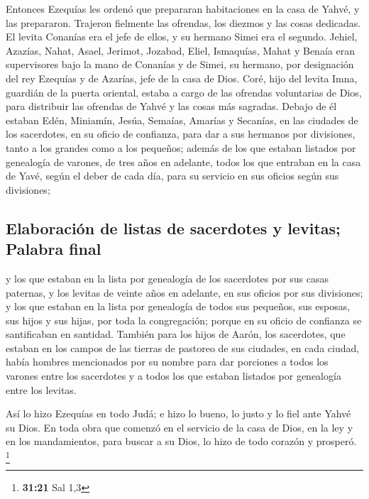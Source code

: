 \begin{paracol}{2}
 Entonces Ezequías les ordenó que prepararan habitaciones
en la casa de Yahvé, y las prepararon.  Trajeron
fielmente las ofrendas, los diezmos y las cosas dedicadas. El levita
Conanías era el jefe de ellos, y su hermano Simei era el segundo.
 Jehiel, Azazías, Nahat, Asael, Jerimot, Jozabad, Eliel,
Ismaquías, Mahat y Benaía eran supervisores bajo la mano de Conanías y
de Simei, su hermano, por designación del rey Ezequías y de Azarías,
jefe de la casa de Dios.  Coré, hijo del levita Imna,
guardián de la puerta oriental, estaba a cargo de las ofrendas
voluntarias de Dios, para distribuir las ofrendas de Yahvé y las cosas
más sagradas.  Debajo de él estaban Edén, Miniamín,
Jesúa, Semaías, Amarías y Secanías, en las ciudades de los sacerdotes,
en su oficio de confianza, para dar a sus hermanos por divisiones, tanto
a los grandes como a los pequeños;  además de los que
estaban listados por genealogía de varones, de tres años en adelante,
todos los que entraban en la casa de Yavé, según el deber de cada día,
para su servicio en sus oficios según sus divisiones;

\hypertarget{elaboraciuxf3n-de-listas-de-sacerdotes-y-levitas-palabra-final}{%
\subsection{Elaboración de listas de sacerdotes y levitas; Palabra
final}\label{elaboraciuxf3n-de-listas-de-sacerdotes-y-levitas-palabra-final}}

 y los que estaban en la lista por genealogía de los
sacerdotes por sus casas paternas, y los levitas de veinte años en
adelante, en sus oficios por sus divisiones;  y los que
estaban en la lista por genealogía de todos sus pequeños, sus esposas,
sus hijos y sus hijas, por toda la congregación; porque en su oficio de
confianza se santificaban en santidad.  También para los
hijos de Aarón, los sacerdotes, que estaban en los campos de las tierras
de pastoreo de sus ciudades, en cada ciudad, había hombres mencionados
por su nombre para dar porciones a todos los varones entre los
sacerdotes y a todos los que estaban listados por genealogía entre los
levitas.

 Así lo hizo Ezequías en todo Judá; e hizo lo bueno, lo
justo y lo fiel ante Yahvé su Dios.  En toda obra que
comenzó en el servicio de la casa de Dios, en la ley y en los
mandamientos, para buscar a su Dios, lo hizo de todo corazón y prosperó.
\footnote{\textbf{31:21} Sal 1,3}


\end{paracol}
